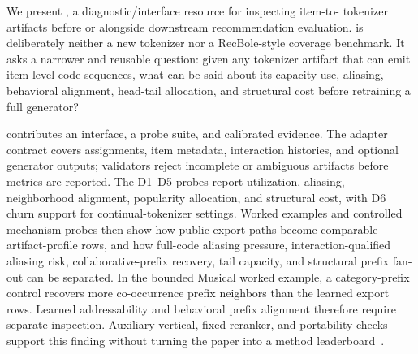 We present \tool, a diagnostic/interface resource for inspecting item-to-\sid{}
tokenizer artifacts before or alongside downstream recommendation evaluation.
\tool is deliberately neither a new tokenizer nor a RecBole-style coverage
benchmark. It asks a narrower and reusable question: given any tokenizer
artifact that can emit item-level code sequences, what can be said about its
capacity use, aliasing, behavioral alignment, head-tail allocation, and
structural cost before retraining a full generator?

\tool contributes an interface, a probe suite, and calibrated evidence. The
adapter contract covers \sid assignments, item metadata, interaction histories,
and optional generator outputs; validators reject incomplete or ambiguous
artifacts before metrics are reported. The D1--D5 probes report utilization,
aliasing, neighborhood alignment, popularity allocation, and structural cost,
with D6 churn support for continual-tokenizer settings. Worked examples and
controlled mechanism probes then show how public \sid export paths become
comparable artifact-profile rows, and how full-code aliasing pressure,
interaction-qualified aliasing risk, collaborative-prefix recovery, tail
capacity, and structural prefix fan-out can be separated. In the bounded
Musical worked example, a category-prefix control recovers more co-occurrence
prefix neighbors than the learned export rows. Learned addressability and
behavioral prefix alignment therefore require separate inspection. Auxiliary
vertical, fixed-reranker, and portability checks support this finding without
turning the paper into a method leaderboard~\cite{cikm2026resource}.
